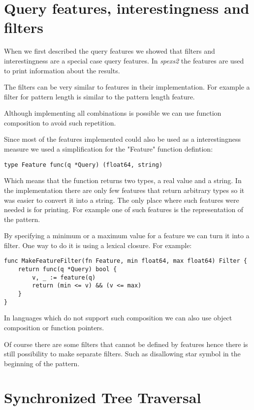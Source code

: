 \section{Query features, interestingness and filters}

When we first described the query features we showed that filters and interestingness are a special case query features. In \emph{spexs2} the features are used to print information about the results.

The filters can be very similar to features in their implementation. For example a filter for pattern length is similar to the pattern length feature.

Although implementing all combinations is possible we can use function composition to avoid such repetition.

Since most of the features implemented could also be used as a interestingness measure we used a simplification for the "Feature" function defintion:

\begin{lstlisting}
type Feature func(q *Query) (float64, string)
\end{lstlisting}

Which means that the function returns two types, a real value and a string. In the implementation there are only few features that return arbitrary types so it was easier to convert it into a string. The only place where such features were needed is for printing. For example one of such features is the representation of the pattern.

By specifying a minimum or a maximum value for a feature we can turn it into a filter. One way to do it is using a lexical closure. For example:

\begin{lstlisting}
func MakeFeatureFilter(fn Feature, min float64, max float64) Filter {
    return func(q *Query) bool {
        v, _ := feature(q)
        return (min <= v) && (v <= max)
    }
}
\end{lstlisting}

In languages which do not support such composition we can also use object composition or function pointers. 

Of course there are some filters that cannot be defined by features hence there is still possibility to make separate filters. Such as disallowing star symbol in the beginning of the pattern.

\section{Synchronized Tree Traversal}

